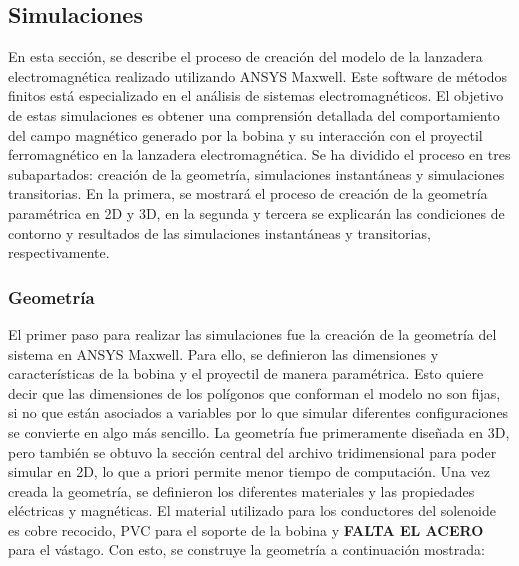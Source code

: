 \subsection{Simulaciones}
\label{subsec:simulaciones}

En esta sección, se describe el proceso de creación del modelo de la lanzadera electromagnética realizado utilizando ANSYS Maxwell. Este software de métodos finitos está especializado en el análisis de sistemas electromagnéticos. El objetivo de estas simulaciones es obtener una comprensión detallada del comportamiento del campo magnético generado por la bobina y su interacción con el proyectil ferromagnético en la lanzadera electromagnética. Se ha dividido el proceso en tres subapartados: creación de la geometría, simulaciones instantáneas y simulaciones transitorias. En la primera, se mostrará el proceso de creación de la geometría paramétrica en 2D y 3D, en la segunda y tercera se explicarán las condiciones de contorno y resultados de las simulaciones instantáneas y transitorias, respectivamente.

\subsubsection{Geometría}
El primer paso para realizar las simulaciones fue la creación de la geometría del sistema en ANSYS Maxwell. Para ello, se definieron las dimensiones y características de la bobina y el proyectil de manera paramétrica. Esto quiere decir que las dimensiones de los polígonos que conforman el modelo no son fijas, si no que están asociados a variables por lo que simular diferentes configuraciones se convierte en algo más sencillo. La geometría fue primeramente diseñada en 3D, pero también se obtuvo la sección central del archivo tridimensional para poder simular en 2D, lo que a priori permite menor tiempo de computación. Una vez creada la geometría, se definieron los diferentes materiales y las propiedades eléctricas y magnéticas. El material utilizado para los conductores del solenoide es cobre recocido, PVC para el soporte de la bobina y \textbf{FALTA EL ACERO} para el vástago. Con esto, se construye la geometría a continuación mostrada:


